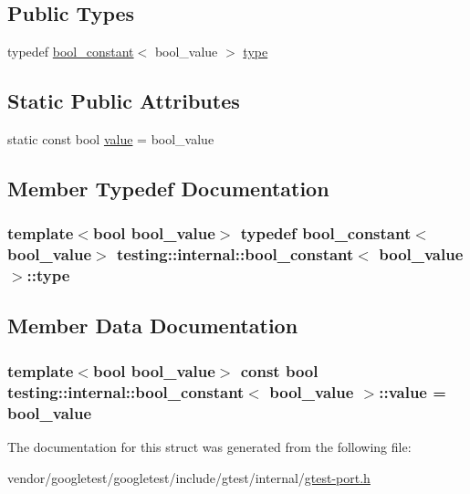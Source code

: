 \subsection*{Public Types}
\begin{DoxyCompactItemize}
\item 
typedef \hyperlink{structtesting_1_1internal_1_1bool__constant}{bool\+\_\+constant}$<$ bool\+\_\+value $>$ \hyperlink{structtesting_1_1internal_1_1bool__constant_aba6d09ecf7eecea6c93480f0d627a167}{type}
\end{DoxyCompactItemize}
\subsection*{Static Public Attributes}
\begin{DoxyCompactItemize}
\item 
static const bool \hyperlink{structtesting_1_1internal_1_1bool__constant_a499fba6576296b04d99690a486424b32}{value} = bool\+\_\+value
\end{DoxyCompactItemize}


\subsection{Member Typedef Documentation}
\subsubsection[{\texorpdfstring{type}{type}}]{\setlength{\rightskip}{0pt plus 5cm}template$<$bool bool\+\_\+value$>$ typedef {\bf bool\+\_\+constant}$<$bool\+\_\+value$>$ {\bf testing\+::internal\+::bool\+\_\+constant}$<$ bool\+\_\+value $>$\+::{\bf type}}\hypertarget{structtesting_1_1internal_1_1bool__constant_aba6d09ecf7eecea6c93480f0d627a167}{}\label{structtesting_1_1internal_1_1bool__constant_aba6d09ecf7eecea6c93480f0d627a167}


\subsection{Member Data Documentation}
\subsubsection[{\texorpdfstring{value}{value}}]{\setlength{\rightskip}{0pt plus 5cm}template$<$bool bool\+\_\+value$>$ const bool {\bf testing\+::internal\+::bool\+\_\+constant}$<$ bool\+\_\+value $>$\+::value = bool\+\_\+value\hspace{0.3cm}{\ttfamily [static]}}\hypertarget{structtesting_1_1internal_1_1bool__constant_a499fba6576296b04d99690a486424b32}{}\label{structtesting_1_1internal_1_1bool__constant_a499fba6576296b04d99690a486424b32}


The documentation for this struct was generated from the following file\+:\begin{DoxyCompactItemize}
\item 
vendor/googletest/googletest/include/gtest/internal/\hyperlink{gtest-port_8h}{gtest-\/port.\+h}\end{DoxyCompactItemize}
